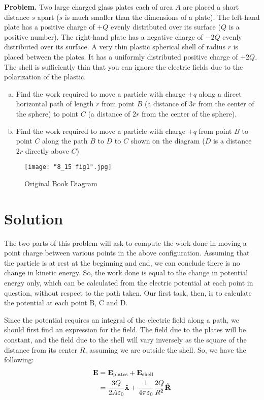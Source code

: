 \documentclass{article}
\begin{document}
\insertTitle

\textbf{Problem.} Two large charged glass plates each of area $A$ are placed a short distance $s$ apart ($s$ is much smaller than the dimensions of a plate). The left-hand plate has a positive charge of $+Q$ evenly distributed over its surface ($Q$ is a positive number). The right-hand plate has a negative charge of $-2Q$ evenly distributed over its surface. A very thin plastic spherical shell of radius $r$ is placed between the plates. It has a uniformly distributed positive charge of $+2Q$. The shell is sufficiently thin that you can ignore the electric fields due to the polarization of the plastic.
\begin{enumerate}[(a)]
    \item Find the work required to move a particle with charge $+q$ along a direct horizontal path of length $r$ from point $B$ (a distance of $3r$ from the center of the sphere) to point $C$ (a distance of $2r$ from the center of the sphere).

    \item Find the work required to move a particle with charge $+q$ from point $B$ to point $C$ along the path $B$ to $D$ to $C$ shown on the diagram ($D$ is a distance $2r$ directly above $C$)
\end{enumerate}

\begin{figure}[H]
\centering
\texttt{[image: "8\_15 fig1".jpg]}
\caption{Original Book Diagram \label{1figure}}
\end{figure}

\section*{Solution}

The two parts of this problem will ask to compute the work done in moving a point charge between various points in the above configuration. Assuming that the particle is at rest at the beginning and end, we can conclude there is no change in kinetic energy. So, the work done is equal to the change in potential energy only, which can be calculated from the electric potential at each point in question, without respect to the path taken. Our first task, then, is to calculate the potential at each point B, C and D.

Since the potential requires an integral of the electric field along a path, we should first find an expression for the field. The field due to the plates will be constant, and the field due to the shell will vary inversely as the square of the distance from its center $R$, assuming we are outside the shell. So, we have the following:
\begin{equation*}
\begin{aligned}
\vb{E} &= \vb{E}_{\text{plates}} + \vb{E}_{\text{shell}} \\
&= \frac{3Q}{2A\varepsilon_0}\vu{x} + \frac{1}{4 \pi\varepsilon_0}\frac{2Q}{R^2}\vu{R}
\end{aligned}
\end{equation*}
\end{document}
